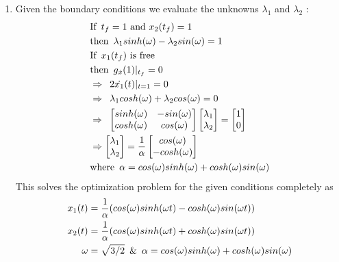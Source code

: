\begin{enumerate}
  \begin{enumerate}
   \item Given the boundary conditions we evaluate the unknowns $\lambda_1$ and $\lambda_2$ :
   \begin{align*}
    &\text{If} \enskip t_f = 1 \text{ and } x_2(t_f) = 1 \\
    &\text{then} \enskip \lambda_1 sinh(\omega) - \lambda_2 sin(\omega) = 1\\
    &\text{If} \enskip x_1(t_f) \text{ is free } \\
    &\text{then} \enskip g_{\dot x} (1) |_{t_f} = 0 \\
    &\Rightarrow \enskip 2 \dot{x_1}(t) |_{t = 1} = 0\\
    &\Rightarrow \enskip \lambda_1 cosh(\omega) + \lambda_2 cos(\omega) = 0\\
    &\Rightarrow \enskip
			  \begin{bmatrix}
			    sinh(\omega) & -sin(\omega)\\
			    cosh(\omega) & cos(\omega) \\
			  \end{bmatrix} 
			  \begin{bmatrix}
                          \lambda_1 \\
			  \lambda_2 \\
                         \end{bmatrix} = 
			 \begin{bmatrix}
			  1 \\
			  0\\
			 \end{bmatrix}\\
    &\Rightarrow 	  \begin{bmatrix}
                          \lambda_1 \\
			  \lambda_2 \\
			 \end{bmatrix} = \frac{1}{\alpha} 
			 \begin{bmatrix}
			  cos(\omega)\\
			  -cosh(\omega)\\
			 \end{bmatrix}\\
			 &\text{where} \enskip \alpha = cos(\omega) sinh(\omega) +cosh(\omega) sin(\omega) \\
   \end{align*}
   This solves the optimization problem for the given conditions completely as 
   \begin{align*}
    x_1(t) &= \frac{1}{\alpha} (cos(\omega) sinh(\omega t) -cosh(\omega) sin(\omega t))\\
    x_2(t) &= \frac{1}{\alpha} (cos(\omega) sinh(\omega t) + cosh(\omega) sin(\omega t))\\
    \omega &= \sqrt{3/2} \enskip \& \enskip \alpha = cos(\omega) sinh(\omega) +cosh(\omega) sin(\omega) \\
   \end{align*}
   

\end{enumerate}
\end{enumerate}

